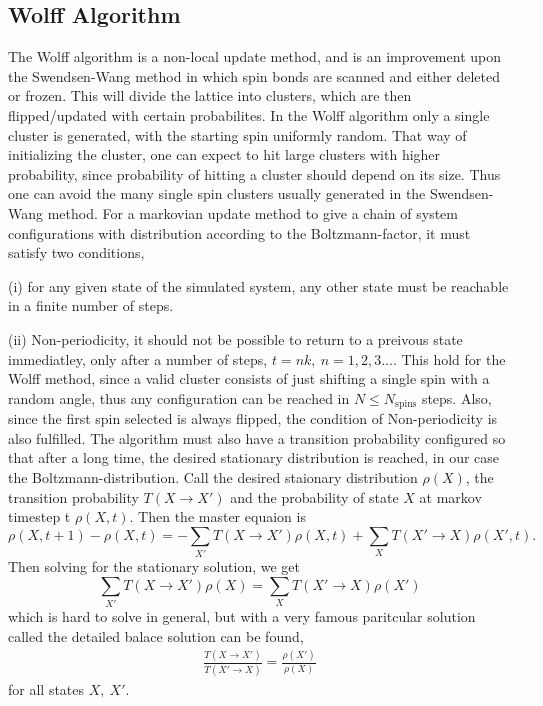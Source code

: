 \documentclass[a4paper]{article}
\newcommand{\trm}[1]{\textrm{#1}}
\begin{document}
\subsection{Wolff Algorithm}
The Wolff algorithm is a non-local update method, and is an improvement upon the Swendsen-Wang method in which spin bonds are scanned and either deleted or frozen. This will divide the lattice into clusters, which are then flipped/updated with certain probabilites. In the Wolff algorithm only a single cluster is generated, with the starting spin uniformly random. That way of initializing the cluster, one can expect to hit large clusters with higher probability, since probability of hitting a cluster should depend on its size.
Thus one can avoid the many single spin clusters usually generated in the Swendsen-Wang method.
For a markovian update method to give a chain of system configurations with distribution according to the Boltzmann-factor, it must satisfy two conditions, 

(i) for any given state of the simulated system, any other state must be reachable in a finite number of steps.

(ii) Non-periodicity, it should not be possible to return to a preivous state immediatley, only after a number of steps, $t =nk,~ n = 1,2,3\dots$.
This hold for the Wolff method, since a valid cluster consists of just shifting a single spin with a random angle, thus any configuration can be reached in $N \leq N_{\trm{spins}}$ steps. Also, since the first spin selected is always flipped, the condition of Non-periodicity is also fulfilled.
The algorithm must also have a transition probability configured so that after a long time, the desired stationary distribution is reached, in our case the Boltzmann-distribution.
Call the desired staionary distribution $\rho(X)$, the transition probability $T(X \rightarrow X')$ and the probability of state $X$ at markov timestep t $\rho(X,t)$.
Then the master equaion is 
\begin{equation}
  \rho(X, t+1) - \rho(X,t) = -\sum_{X'} T(X\rightarrow X')\rho(X,t) +\sum_{X} T(X'\rightarrow X)\rho(X',t).
\end{equation}
Then solving for the stationary solution, we get
\begin{equation}
  \sum_{X'}T(X\rightarrow X') \rho(X) =  \sum_{X}T(X'\rightarrow X) \rho(X')
\end{equation}
which is hard to solve in general, but with a very famous paritcular solution called the detailed balace solution can be found,
\begin{align}
  \frac{T(X\rightarrow X')}{T(X'\rightarrow X)} = \frac{\rho(X')}{\rho(X)} 
  \label{eq:detbal}
\end{align}
for all states $X,~X'$.
\end{document}

